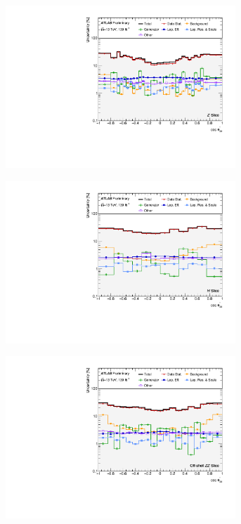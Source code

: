\begin{figure}[hp]
    \centering
    \begin{subfigure}{.49\textwidth}\centering\includegraphics[width = 0.95\textwidth]{Figures/m4l/Systematics/Unfolded/UnfoldedSys_CTS34_vs_M4l_Stack_Paper0.pdf}\end{subfigure}
    \begin{subfigure}{.49\textwidth}\centering\includegraphics[width = 0.95\textwidth]{Figures/m4l/Systematics/Unfolded/UnfoldedSys_CTS34_vs_M4l_Stack_Paper1.pdf}\end{subfigure}
    \begin{subfigure}{.49\textwidth}\centering\includegraphics[width = 0.95\textwidth]{Figures/m4l/Systematics/Unfolded/UnfoldedSys_CTS34_vs_M4l_Stack_Paper2.pdf}\end{subfigure}

\end{figure}
